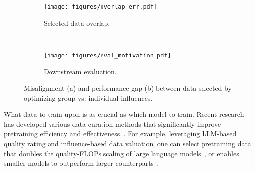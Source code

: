 

\begin{figure}[t]
\vspace{-0.3cm}
    \centering
    \begin{subfigure}{0.227\textwidth}
    \centering
    \texttt{[image: figures/overlap\_err.pdf]}
    \caption{Selected data overlap.}
    \label{fig:overlap-err}
    \end{subfigure}
    ~
    \begin{subfigure}{0.2355\textwidth}
    \centering
    \texttt{[image: figures/eval\_motivation.pdf]}
    \caption{Downstream evaluation.}
    \label{fig:upperbound-err}
    \end{subfigure}
    \vspace{-0.2cm}
    \caption{Misalignment (a) and performance gap (b) between data selected by optimizing group vs. individual influences.} 
    \label{fig:upperbound}
    \vspace{-0.2cm}
\end{figure} 


What data to train upon is as crucial as which model to train. Recent research has developed various data curation methods that significantly improve pretraining efficiency and effectiveness~\cite{albalak2024dataselectionsurvey}.
For example, leveraging LLM-based quality rating and influence-based data valuation, one can select pretraining data that doubles the quality-FLOPs scaling of large language models~\cite{penedo2024fineweb,yu2024mates}, or enables smaller models to outperform larger counterparts~\cite{carranza_datologyai_2024}.


